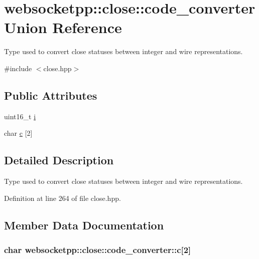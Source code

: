 \hypertarget{unionwebsocketpp_1_1close_1_1code__converter}{}\section{websocketpp\+:\+:close\+:\+:code\+\_\+converter Union Reference}
\label{unionwebsocketpp_1_1close_1_1code__converter}


Type used to convert close statuses between integer and wire representations.  




{\ttfamily \#include $<$close.\+hpp$>$}

\subsection*{Public Attributes}
\begin{DoxyCompactItemize}
\item 
uint16\+\_\+t \hyperlink{unionwebsocketpp_1_1close_1_1code__converter_aa8ed980b85e36e51a24f7eb95c2c3bf7}{i}
\item 
char \hyperlink{unionwebsocketpp_1_1close_1_1code__converter_ad9a9b5ad77cd94c1ac521a3524e42962}{c} \mbox{[}2\mbox{]}
\end{DoxyCompactItemize}


\subsection{Detailed Description}
Type used to convert close statuses between integer and wire representations. 

Definition at line 264 of file close.\+hpp.



\subsection{Member Data Documentation}
\hypertarget{unionwebsocketpp_1_1close_1_1code__converter_ad9a9b5ad77cd94c1ac521a3524e42962}{}
\subsubsection[{c}]{\setlength{\rightskip}{0pt plus 5cm}char websocketpp\+::close\+::code\+\_\+converter\+::c\mbox{[}2\mbox{]}}\label{unionwebsocketpp_1_1close_1_1code__converter_ad9a9b5ad77cd94c1ac521a3524e42962}


